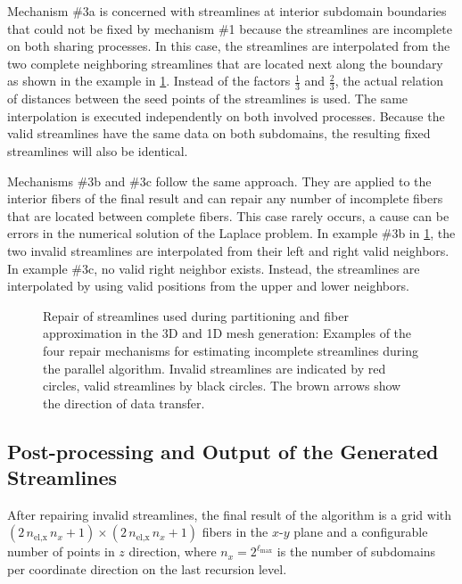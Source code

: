 Mechanism \#3a is concerned with streamlines at interior subdomain boundaries that could not be fixed by mechanism \#1 because the streamlines are incomplete on both sharing processes. In this case, the streamlines are interpolated from the two complete neighboring streamlines that are located next along the boundary as shown in the example in \cref{fig:fix_invalid}. Instead of the factors $\frac13$ and $\frac23$, the actual relation of distances between the seed points of the streamlines is used. The same interpolation is executed independently on both involved processes. Because the valid streamlines have the same data on both subdomains, the resulting fixed streamlines will also be identical.

Mechanisms \#3b and \#3c follow the same approach. They are applied to the interior fibers of the final result and can repair any number of incomplete fibers that are located between complete fibers. This case rarely occurs, a cause can be errors in the numerical solution of the Laplace problem.  In example \#3b in \cref{fig:fix_invalid}, the two invalid streamlines are interpolated from their left and right valid neighbors. In example \#3c, no valid right neighbor exists. Instead, the streamlines are interpolated by using valid positions from the upper and lower neighbors.

\begin{figure}%
  \centering%
  \def\svgwidth{0.8\textwidth}
  
  \caption{Repair of streamlines used during partitioning and fiber approximation in the 3D and 1D mesh generation: Examples of the four repair mechanisms for estimating incomplete streamlines during the parallel algorithm. Invalid streamlines are indicated by red circles, valid streamlines by black circles. The brown arrows show the direction of data transfer.}%
  \label{fig:fix_invalid}%
\end{figure}%

\subsection{Post-processing and Output of the Generated Streamlines}\label{sec:postprocessing_of_the_generated_streamlines}

After repairing invalid streamlines, the final result of the algorithm is a grid with $(2\,n_\text{el,x}\,n_x+1) \times (2\,n_\text{el,x}\,n_x+1)$ fibers in the $x$-$y$ plane and a configurable number of points in $z$ direction, where $n_x = 2^{\ell_\text{max}}$ is the number of subdomains per coordinate direction on the last recursion level. 

